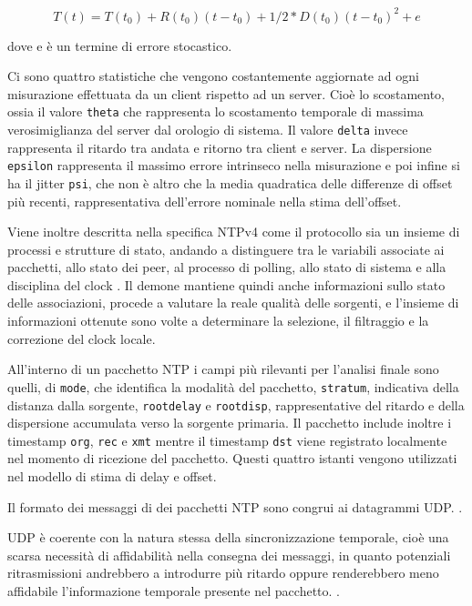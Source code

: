 \[
  T(t) = T(t_{0}) + R(t_{0})(t-t_{0}) + 1/2 * D(t_{0})(t-t_{0})^{2}+ e
\]

dove e è un termine di errore stocastico.

Ci sono quattro statistiche che vengono costantemente aggiornate ad ogni misurazione effettuata 
da un client rispetto ad un server. Cioè lo scostamento, ossia il valore \texttt{theta} che rappresenta 
lo scostamento temporale di massima verosimiglianza del server dal orologio di sistema.
Il valore \texttt{delta} invece rappresenta il ritardo tra andata e ritorno tra client e server.
La dispersione \texttt{epsilon} rappresenta il massimo errore intrinseco nella misurazione e poi infine si 
ha il jitter \texttt{psi}, che non è altro che la media quadratica delle differenze di offset più recenti, 
rappresentativa dell'errore nominale nella stima dell'offset.

Viene inoltre descritta nella specifica NTPv4 come il protocollo sia un insieme di processi
 e strutture di stato, andando a distinguere tra le variabili associate ai pacchetti, allo stato 
 dei peer, al processo di polling, allo stato di sistema e alla disciplina del clock \cite{martinNetworkTimeProtocol2010}.
Il demone mantiene quindi anche informazioni sullo stato delle associazioni, procede a valutare la reale 
qualità delle sorgenti, e l'insieme di informazioni ottenute sono volte a determinare la selezione, il filtraggio e la correzione del clock locale.

All'interno di un pacchetto NTP i campi più rilevanti per l'analisi finale sono quelli, di 
\texttt{mode}, che identifica la modalità del pacchetto, \texttt{stratum}, indicativa della distanza dalla 
sorgente, \texttt{rootdelay} e \texttt{rootdisp}, rappresentative del ritardo e della dispersione accumulata 
 verso la sorgente primaria.
Il pacchetto include inoltre i timestamp \texttt{org}, \texttt{rec} e \texttt{xmt}
mentre il timestamp \texttt{dst} viene registrato localmente nel momento di 
ricezione del pacchetto. Questi quattro istanti vengono utilizzati nel modello di stima
di delay e offset. \cite{martinNetworkTimeProtocol2010}


Il formato dei messaggi di dei pacchetti NTP sono congrui ai datagrammi UDP. \cite{martinNetworkTimeProtocol2010}.

UDP è coerente con la natura stessa della sincronizzazione temporale, cioè una scarsa necessità di affidabilità nella consegna dei messaggi, 
in quanto potenziali ritrasmissioni andrebbero a introdurre più ritardo oppure renderebbero meno 
affidabile l'informazione temporale presente nel pacchetto. \cite{martinNetworkTimeProtocol2010}.

